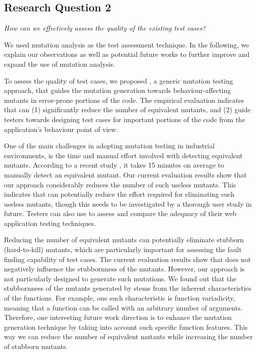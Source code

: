 \subsection{Research Question 2}

\emph{How can we effectively assess the quality of the existing \javascript test cases?}

We used mutation analysis as the test assessment technique. In the following, we explain our observations as well as potential future works to further improve and expand the use of mutation analysis. 

 To assess the quality of test cases, we proposed \mutandis, a generic mutation testing approach, that guides the mutation generation towards behaviour-affecting mutants in error-prone portions of the code. The empirical evaluation indicates that \mutandis can (1) significantly reduce the number of equivalent mutants, and (2) guide testers towards designing test cases for important portions of the code from the application's behaviour point of view. 

One of the main challenges in adopting mutation testing in industrial environments, is the time and manual effort involved with detecting equivalent mutants. According to a recent study \cite{madeyski:tse13}, it takes 15 minutes on average to manually detect an equivalent mutant. Our current evaluation results show that our approach considerably reduces the number of such useless mutants. This indicates that \mutandis can potentially reduce the effort required for eliminating such useless mutants, though this needs to be investigated by a thorough user study in future.
Testers can also use \mutandis to assess and compare the adequacy of their web application testing techniques.  

 Reducing the number of equivalent mutants can potentially eliminate stubborn (hard-to-kill) mutants, which are particularly important for assessing the fault finding capability of test cases. The current evaluation results show that \mutandis does not negatively influence the stubbornness of the mutants.
However, our approach is not particularly designed to generate such mutations.
We found out that the stubbornness of the mutants generated by \mutandis stems from the inherent characteristics of the \javascript functions. For example, one such characteristic is function variadicity, meaning that a function can be called with an arbitrary number of arguments. 
Therefore, one interesting future work direction is to enhance the mutation generation technique by taking into account such specific function features. This way we can reduce the number of equivalent mutants while increasing the number of stubborn mutants.

